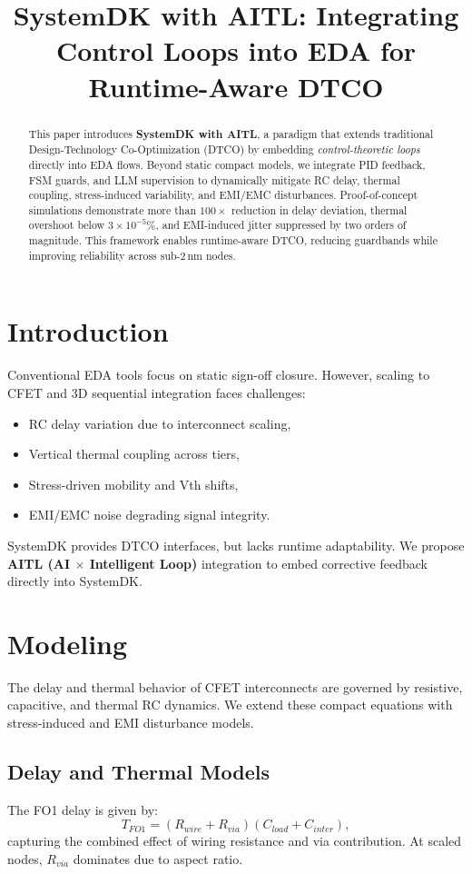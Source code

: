 \documentclass[conference]{IEEEtran}
\title{SystemDK with AITL: Integrating Control Loops into EDA for Runtime-Aware DTCO}
\author{
  \IEEEauthorblockN{Shinichi Samizo}
  \IEEEauthorblockA{Independent Semiconductor Researcher\\
  Email: \href{mailto:shin3t72@gmail.com}{shin3t72@gmail.com}}
}
\begin{document}
\maketitle

\begin{abstract}
This paper introduces \textbf{SystemDK with AITL}, a paradigm that extends 
traditional Design-Technology Co-Optimization (DTCO) by embedding 
\emph{control-theoretic loops} directly into EDA flows. 
Beyond static compact models, we integrate PID feedback, FSM guards, 
and LLM supervision to dynamically mitigate RC delay, thermal coupling, 
stress-induced variability, and EMI/EMC disturbances. 
Proof-of-concept simulations demonstrate more than $100\times$ reduction in delay deviation,
thermal overshoot below $3\times 10^{-5}\%$, and EMI-induced jitter suppressed by two orders of magnitude. 
This framework enables runtime-aware DTCO, reducing guardbands while improving reliability across sub-2\,nm nodes.
\end{abstract}

\section{Introduction}
Conventional EDA tools focus on static sign-off closure. 
However, scaling to CFET and 3D sequential integration faces challenges:
\begin{itemize}
  \item RC delay variation due to interconnect scaling,
  \item Vertical thermal coupling across tiers,
  \item Stress-driven mobility and Vth shifts,
  \item EMI/EMC noise degrading signal integrity.
\end{itemize}
SystemDK provides DTCO interfaces, but lacks runtime adaptability.
We propose \textbf{AITL (AI $\times$ Intelligent Loop)} integration to embed corrective feedback directly into SystemDK.

\section{Modeling}
The delay and thermal behavior of CFET interconnects are governed by resistive,
capacitive, and thermal RC dynamics. We extend these compact equations with
stress-induced and EMI disturbance models.

\subsection{Delay and Thermal Models}
The FO1 delay is given by:
\begin{equation}
T_{FO1} = (R_{wire}+R_{via})(C_{load}+C_{inter}),
\end{equation}
capturing the combined effect of wiring resistance and via contribution.
At scaled nodes, $R_{via}$ dominates due to aspect ratio.
\end{document}

